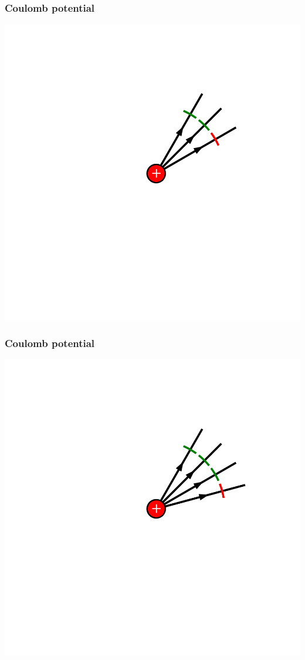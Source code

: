 \documentclass{beamer}
\begin{document}
\begin{frame}
\frametitle{Coulomb potential}
\begin{center}
	\includegraphics[width=0.75\columnwidth]{figs/seq/frame3}
\end{center}
\end{frame}
 \begin{frame}
\frametitle{Coulomb potential}
\begin{center}
	\includegraphics[width=0.75\columnwidth]{figs/seq/frame4}
\end{center}
\end{frame}
\end{document}
